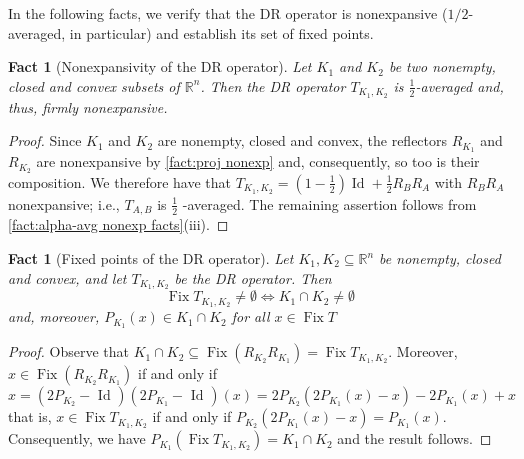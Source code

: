 \documentclass[smallextended,numbook,nospthms]{svjour3}
\theoremstyle{plain}
\newtheorem{fact}[theorem]{Fact}
\theoremstyle{definition}
\def\RR{\mathds R}
\DeclareMathOperator{\Id}{Id}
\begin{document}
In the following facts, we verify that the DR operator is nonexpansive ($1/2$-averaged, in particular) and establish its set of fixed points.
\begin{fact}[Nonexpansivity of the DR operator]\label{fact:DR nonexp}
Let $K_1$ and $K_{2}$ be two nonempty, closed and convex subsets of $\RR^n$. Then the DR operator $T_{K_1, K_2}$ is $\frac{1}{2}$-averaged and, thus, firmly nonexpansive.
\end{fact}
\begin{proof}
Since $K_1$ and $K_2$ are nonempty, closed and convex, the reflectors $R_{K_1}$ and $R_{K_2}$ are nonexpansive by \cref{fact:proj nonexp} and, consequently, so too is their composition. We therefore have that $T_{K_1, K_2}=\left(1-\frac{1}{2}\right) \Id+\frac{1}{2} R_{B} R_{A}$ with $R_{B} R_{A}$ nonexpansive; i.e., $T_{A, B}$ is $\frac{1}{2}$ -averaged. The remaining assertion follows from \cref{fact:alpha-avg nonexp facts}(iii).
\end{proof}

\begin{fact}[Fixed points of the DR operator]\label{fact:DR Fix}
Let $K_1, K_2 \subseteq \RR^n$ be nonempty, closed and convex, and let $T_{K_1, K_2}$ be the DR operator. Then
\[
\operatorname{Fix} T_{K_1, K_2} \neq \emptyset \Longleftrightarrow K_1 \cap K_2 \neq \emptyset
\]
and, moreover, $P_{K_1}(x) \in K_1 \cap K_2$ for all $x \in \operatorname{Fix} T$
\end{fact}
\begin{proof}
Observe that $K_1 \cap K_2 \subseteq \operatorname{Fix}\left(R_{K_2} R_{K_1}\right)=\operatorname{Fix} T_{K_1, K_2}$. Moreover, $x \in \operatorname{Fix}\left(R_{K_2} R_{K_1}\right)$ if and only if
\[
x=\left(2 P_{K_2}-\text { Id }\right)\left(2 P_{K_1}-\text { Id }\right)(x)=2 P_{K_2}\left(2 P_{K_1}(x)-x\right)-2 P_{K_1}(x)+x
\]
that is, $x \in \operatorname{Fix} T_{K_1, K_2}$ if and only if $P_{K_2}\left(2 P_{K_1}(x)-x\right)=P_{K_1}(x)$. Consequently, we have $P_{K_1}\left(\operatorname{Fix} T_{K_1, K_2}\right)=K_1 \cap K_2$ and the result follows.
\end{proof}
\end{document}
